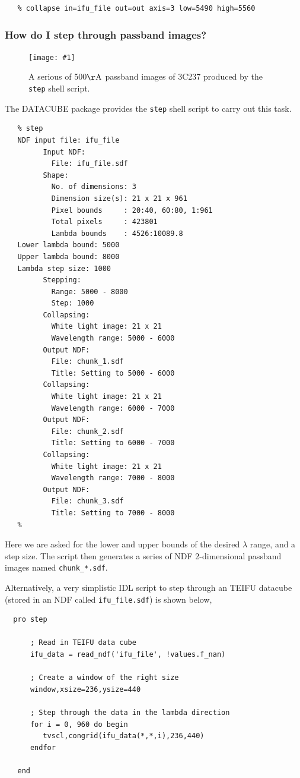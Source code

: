 \documentclass[twoside,11pt]{article}
\newcommand{\htmladdimg}[1]{}
\newcommand{\xref}[3]{#1}
\newcommand{\myfig} [5] {
  \begin{figure}
    \centering\texttt{[image: \#1]}
    \typeout{#1 inserted on page \arabic{page}}
    \caption{\label{#4}#5}
  \end{figure}
  }
\newcommand{\myfig}[5]{
    \label{#4} \htmladdimg{#3}\\
    Figure: #5\\
    }
\begin{document}
\small\begin{verbatim}
   % collapse in=ifu_file out=out axis=3 low=5490 high=5560
\end{verbatim}\normalsize

\subsubsection{How do I step through passband images?}

\myfig{sc16_step.eps}{height=0.4\textheight}{sc16_step.gif}{sc16_step_fig}{A serious of 500${\rm \AA}$ passband images of 3C237 produced by the {\tt step} shell script.} 

The DATACUBE package provides the \xref{{\tt step}}{sun237}{step} shell script to carry out this task.

\small\begin{verbatim}
   % step
   NDF input file: ifu_file
         Input NDF:
           File: ifu_file.sdf
         Shape:
           No. of dimensions: 3
           Dimension size(s): 21 x 21 x 961
           Pixel bounds     : 20:40, 60:80, 1:961
           Total pixels     : 423801
           Lambda bounds    : 4526:10089.8
   Lower lambda bound: 5000
   Upper lambda bound: 8000
   Lambda step size: 1000
         Stepping:
           Range: 5000 - 8000
           Step: 1000
         Collapsing:
           White light image: 21 x 21
           Wavelength range: 5000 - 6000
         Output NDF:
           File: chunk_1.sdf
           Title: Setting to 5000 - 6000
         Collapsing:
           White light image: 21 x 21
           Wavelength range: 6000 - 7000
         Output NDF:
           File: chunk_2.sdf
           Title: Setting to 6000 - 7000
         Collapsing:
           White light image: 21 x 21
           Wavelength range: 7000 - 8000
         Output NDF:
           File: chunk_3.sdf
           Title: Setting to 7000 - 8000
   %
\end{verbatim}\normalsize

Here we are asked for the lower and upper bounds of the desired $\lambda$ range, and a step size. The script then generates a series of NDF 2-dimensional passband images named \verb+chunk_*.sdf+. 

Alternatively, a very simplistic IDL script to step through an TEIFU datacube (stored in an NDF called {\tt ifu\_file.sdf}) is shown below,

\small\begin{verbatim}
  pro step
      
      ; Read in TEIFU data cube
      ifu_data = read_ndf('ifu_file', !values.f_nan)
      
      ; Create a window of the right size
      window,xsize=236,ysize=440
      
      ; Step through the data in the lambda direction
      for i = 0, 960 do begin
         tvscl,congrid(ifu_data(*,*,i),236,440)
      endfor 
      
   end
\end{verbatim}\normalsize
\end{document}
